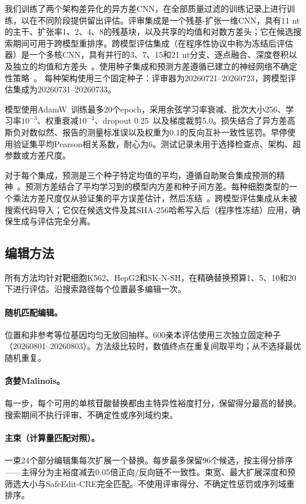 我们训练了两个架构差异化的异方差CNN，在全部质量过滤的训练记录上进行训练，以在不同阶段提供留出评估。评审集成是一个残基-扩张一维CNN，具有11 nt的主干、扩张率1、2、4、8的残基块，以及共享的均值和对数方差头；它在候选搜索期间可用于跨模型重排序。跨模型评估集成（在程序性协议中称为冻结后评估器）是一个多核CNN，具有并行的3、7、15和21 nt分支、逐点融合、深度卷积以及独立的均值和方差头~\citep{He2016,Lakshminarayanan2017}。使用种子集成和预测方差遵循已建立的神经网络不确定性策略~\citep{Gal2016,Blundell2015,Lakshminarayanan2017}。
每种架构使用三个固定种子：评审器为20260721--20260723，跨模型评估集成为20260731--20260733。

模型使用AdamW~\citep{Loshchilov2019}训练最多20个epoch，采用余弦学习率衰减、批次大小256、学习率$10^{-3}$、权重衰减$10^{-4}$、dropout 0.25~\citep{Srivastava2014}以及梯度裁剪5.0。损失结合了异方差高斯负对数似然、报告的测量标准误以及权重为0.1的反向互补一致性惩罚。早停使用验证集平均Pearson相关系数，耐心为6。测试记录未用于选择检查点、架构、超参数或方差尺度。

对于每个集成，预测是三个种子特定均值的平均，遵循自助聚合集成预测的精神~\citep{Breiman2001}。预测方差结合了平均学习到的模型内方差和种子间方差。每种细胞类型的一个乘法方差尺度仅从验证集的平方误差估计，然后冻结~\citep{Ovadia2019}。跨模型评估集成从未被搜索代码导入；它仅在候选文件及其SHA-256哈希写入后（程序性冻结）应用，确保生成与评估完全分离。

\subsection{编辑方法}

所有方法均针对靶细胞K562、HepG2和SK-N-SH，在精确替换预算1、5、10和20下进行评估。沿搜索路径每个位置最多编辑一次。

\paragraph{随机匹配编辑。}
位置和非参考等位基因均匀无放回抽样。600亲本评估使用三次独立固定种子（20260801--20260803）。方法级比较时，数值终点在重复间取平均；从不选择最优随机重复。

\paragraph{贪婪Malinois。}
每一步，每个可用的单核苷酸替换都由主特异性裕度打分，保留得分最高的替换。搜索期间不执行评审、不确定性或序列域约束。

\paragraph{主束（计算量匹配对照）。}
一束24个部分编辑集每次扩展一个替换。每步最多保留96个候选，按主得分排序——主得分为主裕度减去0.05倍正向/反向链不一致性。束宽、最大扩展深度和预筛选大小与SafeEdit-CRE完全匹配。不使用评审得分、不确定性惩罚或序列域重排序。

